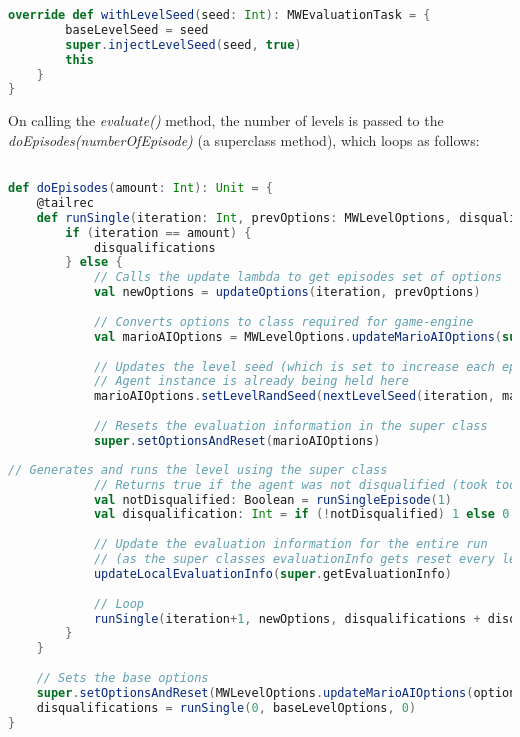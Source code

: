 \begin{minipage}{0.9\linewidth}
\centering
\begin{lstlisting}[language=scala]   
    override def withLevelSeed(seed: Int): MWEvaluationTask = {
        baseLevelSeed = seed
        super.injectLevelSeed(seed, true)
        this
    }
}
\end{lstlisting}
\end{minipage}  

On calling the \emph{evaluate()} method, the number of levels is passed to the \emph{doEpisodes(numberOfEpisode)} (a superclass method), which loops as follows:

\begin{minipage}{0.9\linewidth}
\centering
\begin{lstlisting}[language=scala]

def doEpisodes(amount: Int): Unit = {
    @tailrec
    def runSingle(iteration: Int, prevOptions: MWLevelOptions, disqualifications: Int): Int = {
        if (iteration == amount) { 
            disqualifications
        } else {
            // Calls the update lambda to get episodes set of options
            val newOptions = updateOptions(iteration, prevOptions)
            
            // Converts options to class required for game-engine
            val marioAIOptions = MWLevelOptions.updateMarioAIOptions(super.options, newOptions)
            
            // Updates the level seed (which is set to increase each episode by MWEvaluationClass)
            // Agent instance is already being held here
            marioAIOptions.setLevelRandSeed(nextLevelSeed(iteration, marioAIOptions.getLevelRandSeed))
            
            // Resets the evaluation information in the super class
            super.setOptionsAndReset(marioAIOptions)
\end{lstlisting}
\end{minipage}

\begin{minipage}{0.9\linewidth}
\centering
\begin{lstlisting}[language=scala]
            // Generates and runs the level using the super class
            // Returns true if the agent was not disqualified (took too long to return an action)
            val notDisqualified: Boolean = runSingleEpisode(1)
            val disqualification: Int = if (!notDisqualified) 1 else 0
       
            // Update the evaluation information for the entire run
            // (as the super classes evaluationInfo gets reset every level
            updateLocalEvaluationInfo(super.getEvaluationInfo)
            
            // Loop
            runSingle(iteration+1, newOptions, disqualifications + disqualified)
        }
    }
    
    // Sets the base options
    super.setOptionsAndReset(MWLevelOptions.updateMarioAIOptions(options, baseLevelOptions))
    disqualifications = runSingle(0, baseLevelOptions, 0)
}
\end{lstlisting}
\end{minipage}



